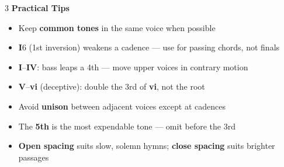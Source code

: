 \documentclass[letterpaper]{article}
\newcommand{\rn}[2]{\textbf{#1}#2}
\begin{document}
\begin{multicols}{3}
\vspace{4mm}
{\small\colorbox{headerbg}{\color{white}\textbf{\quad Practical Tips\quad}}}

\vspace{2mm}
{\small
\begin{itemize}
  \item Keep \textbf{common tones} in the same voice when possible
  \item \rn{I}{6} (1st inversion) weakens a cadence --- use for passing chords, not finals
  \item \rn{I}{}--\rn{IV}{}: bass leaps a 4th --- move upper voices in contrary motion
  \item \rn{V}{}--\rn{vi}{} (deceptive): double the 3rd of \rn{vi}{}, not the root
  \item Avoid \textbf{unison} between adjacent voices except at cadences
  \item The \textbf{5th} is the most expendable tone --- omit before the 3rd
  \item \textbf{Open spacing} suits slow, solemn hymns; \textbf{close spacing} suits brighter passages
\end{itemize}
}

\end{multicols}
\end{document}
